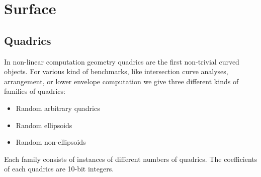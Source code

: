 \section{Surface\label{bi_sec:Surface}}

\subsection{Quadrics\label{bi_ssec:Quadrics}}

In non-linear computation geometry quadrics are the first non-trivial
curved objects. For various kind of benchmarks, like intersection
curve analyses, arrangement, or lower envelope computation we give
three different kinds of families of quadrics: 
\begin{itemize}
\item Random arbitrary quadrics\\
\item Random ellipsoids
\item Random non-ellipsoids
\end{itemize}

Each family consists of instances of different numbers of quadrics. The
coefficients of each quadrics are 10-bit integers.

